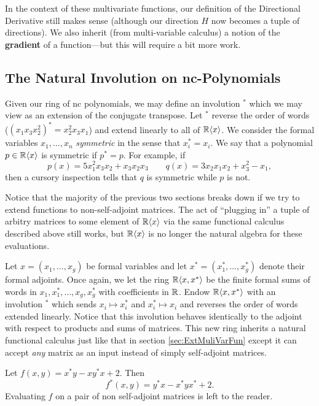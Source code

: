 In the context of these multivariate functions, our definition of the
Directional Derivative still makes sense (although our direction \(H\) now
becomes a tuple of directions). We also inherit (from multi-variable calculus) a
notion of the \textbf{gradient} of a function---but this will require a bit more work.

\subsection{The Natural Involution on nc-Polynomials}%
\label{ssec:NatInvo}

Given our ring of nc polynomials, we may define an involution \(^*\) which we
may view as an extension of the conjugate transpose. Let \(^*\) reverse the
order of words (\ie \((x_1x_3x_2^2)^* = x_2^2x_3x_1\)) and extend linearly to
all of \(\mathbb{R} \langle x \rangle \). We consider the formal
variables \(x_1, \dots , x_n\) \emph{symmetric} in the sense that
\(x_i^* = x_i\). We say that a polynomial \(p \in \mathbb{R} \langle x \rangle \) is
symmetric if \(p^* = p\). For example, if
\[
  p(x) = 5x_1^2x_3x_2 + x_3x_2x_3 \qquad q(x) = 3x_2x_1x_2 + x_3^2 - x_1 ,
\]
then a cursory inspection tells that \(q\) is symmetric while \(p\) is not.

Notice that the majority of the previous two sections breaks down if we try to
extend functions to non-self-adjoint matrices. The act of ``plugging in''
a tuple of arbitry matrices to some element of \(\mathbb{R} \langle x \rangle \) via the same
functional calculus described above still works, but \(\mathbb{R} \langle x \rangle \)
is no longer the natural algebra for these evaluations.

Let \(x = (x_1, \dots, x_g)\) be formal variables and let
\(x^* = (x_1^*, \dots, x_g^*)\) denote their formal adjoints. Once again, we let
the ring \(\mathbb{R} \langle x,x^* \rangle \) be the finite formal sums of words in
\(x_1,x_1^*, \dots , x_g,x_g^*\) with coefficients in \(\mathbb{R} \). Endow
\(\mathbb{R} \langle x,x^* \rangle \) with an involution \(^*\) which sends
\(x_i \mapsto x_i^*\) and \(x_i^* \mapsto x_i\) and reverses the order of words
extended linearly. Notice that this involution behaves identically to the
adjoint with respect to products and sums of matrices. This new ring inherits a
natural functional calculus just like that in section \ref{sec:ExtMuliVarFun}
except it can accept \emph{any} matrix as an input instead of simply
self-adjoint matrices.

\begin{example}
  Let \(f(x,y) = x^*y - x y^* x +2\). Then
  \[
    f^*(x,y) = y^*x - x^*yx^* + 2.
  \]
  Evaluating \(f\) on a pair of non self-adjoint matrices is left to the reader.
\end{example}

